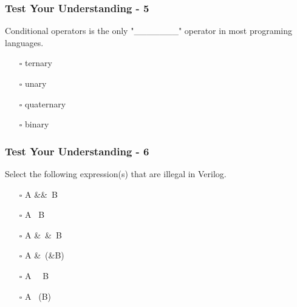 \documentclass[t, notes, xcolor=table]{beamer}
\begin{document}
\begin{frame}
\frametitle{Test Your Understanding - 5}
Conditional operators is the only "\_\_\_\_\_\_\_" operator in most programing languages.
\begin{itemize}
\item[$\square$] ternary
\item[$\square$] unary
\item[$\square$] quaternary
\item[$\square$] binary
\end{itemize}
\end{frame}

\begin{frame}
\frametitle{Test Your Understanding - 6}
Select the following expression(s) that are illegal in Verilog.
\begin{itemize}
\item[$\square$] A \&\&\ B
\item[$\square$] A \textbar\textbar\ B
\item[$\square$] A \&\ \&\ B
\item[$\square$] A \&\ (\&B)
\item[$\square$] A \textbar\ \textbar\ B
\item[$\square$] A \textbar\ (\textbar B)
\end{itemize}
\end{frame}
\end{document}

